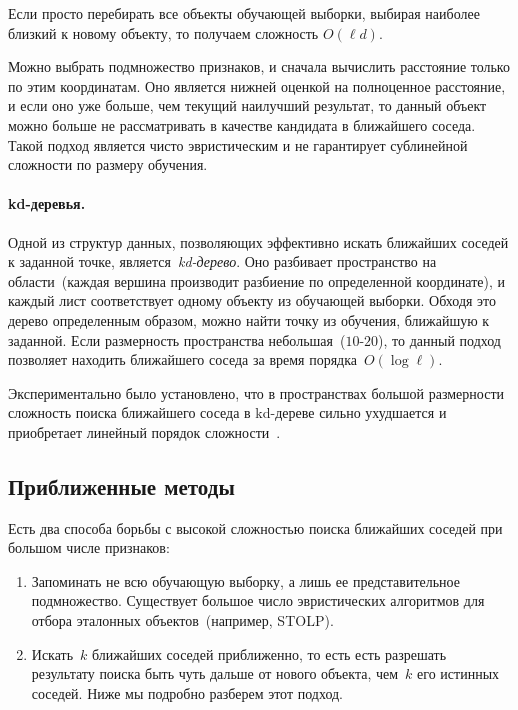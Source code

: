 \documentclass[12pt,fleqn]{article}
\begin{document}
Если просто перебирать все объекты обучающей выборки,
выбирая наиболее близкий к новому объекту, то получаем сложность $O(\ell d)$.

Можно выбрать подмножество признаков, и сначала вычислить расстояние только по этим координатам.
Оно является нижней оценкой на полноценное расстояние,
и если оно уже больше, чем текущий наилучший результат, то данный объект можно больше
не рассматривать в качестве кандидата в ближайшего соседа.
Такой подход является чисто эвристическим и не гарантирует
сублинейной сложности по размеру обучения.

\paragraph{kd-деревья.}
Одной из структур данных, позволяющих эффективно искать ближайших соседей
к заданной точке, является~\emph{kd-дерево}.
Оно разбивает пространство на области~(каждая вершина производит разбиение
по определенной координате), и каждый лист соответствует одному объекту из обучающей выборки.
Обходя это дерево определенным образом, можно найти точку из обучения, ближайшую к заданной.
Если размерность пространства небольшая~($10$-$20$),
то данный подход позволяет находить ближайшего соседа за время порядка~$O(\log \ell)$.

Экспериментально было установлено, что в пространствах большой размерности сложность
поиска ближайшего соседа в kd-дереве сильно ухудшается и приобретает линейный
порядок сложности~\cite{weber98similarity}.

\subsection{Приближенные методы}
Есть два способа борьбы с высокой сложностью поиска ближайших соседей при большом числе признаков:
\begin{enumerate}
    \item Запоминать не всю обучающую выборку, а лишь ее представительное подмножество.
        Существует большое число эвристических алгоритмов для отбора эталонных объектов~(например, STOLP).
    \item Искать~$k$ ближайших соседей приближенно, то есть есть разрешать
        результату поиска быть чуть дальше от нового объекта, чем~$k$ его истинных соседей.
        Ниже мы подробно разберем этот подход.
\end{enumerate}
\end{document}
